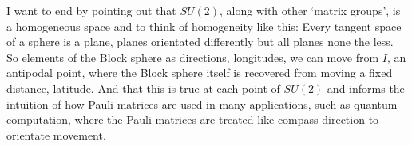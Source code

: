 I want to end by pointing out that $SU(2)$,
along with other `matrix groups',
is a homogeneous space and to think of 
homogeneity like this:
Every tangent space of a sphere is a plane,
planes orientated differently but all planes none the less.
So elements of the Block sphere as directions, longitudes, we can move from $I$, an antipodal point, where the Block sphere itself is recovered from moving a fixed distance, latitude.
And that this is true at each point of $SU(2)$ and informs the intuition of how Pauli matrices are used in many applications,
such as quantum computation,
where the Pauli matrices are treated like compass direction to orientate movement. 
